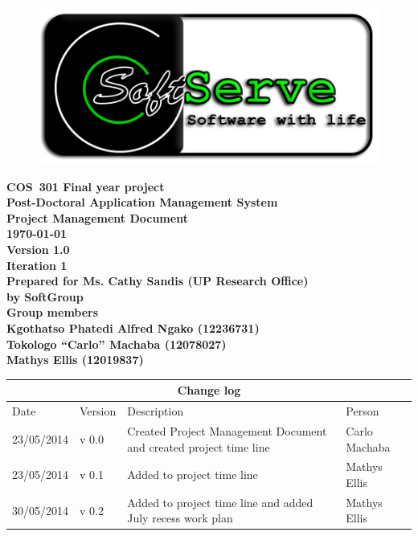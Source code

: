 \documentclass[12pt]{article}
\newcommand{\Title}{Project Management Document} %
\newcommand{\Class}{COS\ 301 Final year project} %
\newcommand{\ssr}{Soft\color{green}{Serve }\color{black}}
\newcommand{\version}{1.0}
\newcommand{\iteration}{1}
\newcommand{\client}{Ms. Cathy Sandis (UP Research Office)}
\newcommand{\project}{Post-Doctoral Application Management System}
\begin{document}
\vspace{4em}

\begin{center}%

\begin{figure}[ht!]
\centering
\includegraphics{../Images_Docs/logo.png}
\end{figure}
\LARGE \bf \Class \\[0.25em]
\LARGE \bf \project \\[1em]
\LARGE \bf \Title \\[0.25em]
\large \bf \today\\
\bf Version \version\\
\bf Iteration \iteration\\[0.5em]
\Large \bf Prepared for \client\\
\Large \bf by
\Large {\bf \ssr Group }\\[0.5em]
\LARGE {\bf Group members}\\[0.25em]
\large
Kgothatso Phatedi Alfred Ngako (12236731) \\[0.5em]
Tokologo “Carlo” Machaba (12078027) \\[0.5em]
Mathys Ellis (12019837) \\[8em]

\end{center}%


\begin{center}
\begin{tabular}{|l|p{1.4cm}|p{8cm}|p{2.8cm}|}
\hline
\multicolumn{4}{|c|}{\bf Change log} \\
\hline
 Date & Version & Description &  Person \\
\hline
23/05/2014 & v 0.0 & Created Project Management Document and created project time line & Carlo Machaba \\
\hline
23/05/2014 & v 0.1 & Added to project time line & Mathys Ellis \\
\hline
30/05/2014 & v 0.2 & Added to project time line and added July recess work plan & Mathys Ellis \\
\hline

\end{tabular}
\end{center}
\newpage
\tableofcontents
\end{document}
